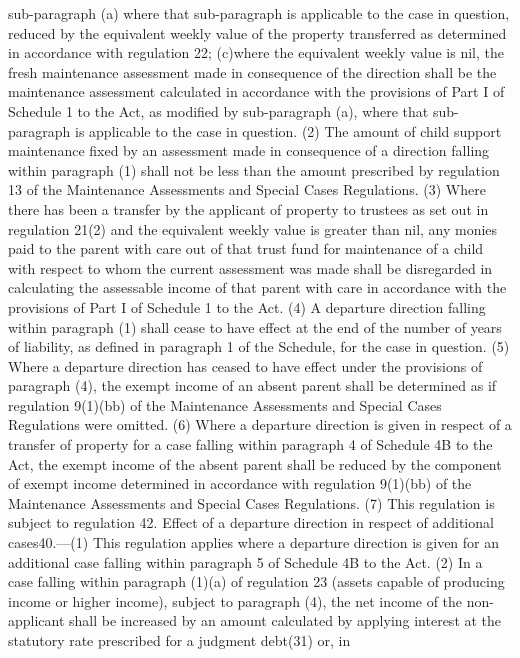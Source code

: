 \documentclass[a4paper]{article}
\begin{document}
sub-paragraph (a) where that sub-paragraph is applicable to the case in
question, reduced by the equivalent weekly value of the property transferred as
determined in accordance with regulation 22;
(c)where the equivalent weekly value is nil, the fresh maintenance assessment
made in consequence of the direction shall be the maintenance assessment
calculated in accordance with the provisions of Part I of Schedule 1 to the Act,
as modified by sub-paragraph (a), where that sub-paragraph is applicable to the
case in question.
(2) The amount of child support maintenance fixed by an assessment made in
consequence of a direction falling within paragraph (1) shall not be less than
the amount prescribed by regulation 13 of the Maintenance Assessments and
Special Cases Regulations.
(3) Where there has been a transfer by the applicant of property to trustees as
set out in regulation 21(2) and the equivalent weekly value is greater than nil,
any monies paid to the parent with care out of that trust fund for maintenance
of a child with respect to whom the current assessment was made shall be
disregarded in calculating the assessable income of that parent with care in
accordance with the provisions of Part I of Schedule 1 to the Act.
(4) A departure direction falling within paragraph (1) shall cease to have
effect at the end of the number of years of liability, as defined in paragraph 1
of the Schedule, for the case in question.
(5) Where a departure direction has ceased to have effect under the provisions
of paragraph (4), the exempt income of an absent parent shall be determined as
if regulation 9(1)(bb) of the Maintenance Assessments and Special Cases
Regulations were omitted.
(6) Where a departure direction is given in respect of a transfer of property
for a case falling within paragraph 4 of Schedule 4B to the Act, the exempt
income of the absent parent shall be reduced by the component of exempt income
determined in accordance with regulation 9(1)(bb) of the Maintenance Assessments
and Special Cases Regulations.
(7) This regulation is subject to regulation 42.
Effect of a departure direction in respect of additional cases40.—(1) This
regulation applies where a departure direction is given for an additional case
falling within paragraph 5 of Schedule 4B to the Act.
(2) In a case falling within paragraph (1)(a) of regulation 23 (assets capable
of producing income or higher income), subject to paragraph (4), the net income
of the non-applicant shall be increased by an amount calculated by applying
interest at the statutory rate prescribed for a judgment debt(31) or, in
\end{document}
